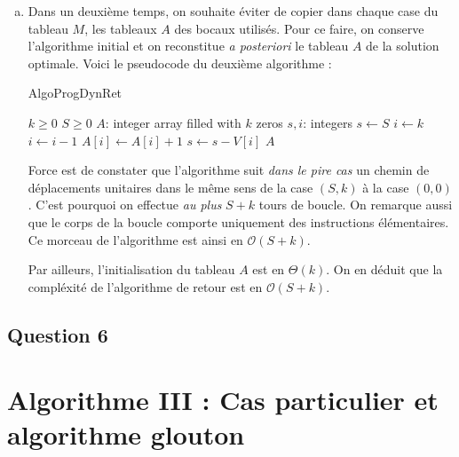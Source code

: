 \documentclass[12pt,a4paper]{article}
\newcommand{\BigO}{\mathcal{O}}
\begin{document}
\begin{enumerate}[a)]
 \item Dans un deuxi\`eme temps, on souhaite \'eviter de copier dans chaque case du tableau $M$, les tableaux $A$ des bocaux utilis\'es. Pour ce faire, on conserve l'algorithme initial et on reconstitue {\itshape a posteriori} le tableau $A$ de la solution optimale. Voici le pseudocode du deuxi\`eme algorithme :
 \begin{algorithm}
\caption{AlgoProgDynRet}
\begin{algorithmic}[1]
\Require $k \geq 0$ \AND $S \geq 0$
    \State $A$: integer array filled with $k$ zeros
    \State $s, i$: integers
    \State $s \gets S$
    \State $i \gets k$
            \State $i \gets i-1$
        \Else
            \State $A[i] \gets A[i] + 1$
            \State $s \gets s - V[i]$
        \EndIf
    \EndWhile
    \State \Return $A$
\EndFunction
\end{algorithmic}
\end{algorithm}

 
 Force est de constater que l'algorithme suit {\itshape dans le pire cas} un chemin de d\'eplacements unitaires dans le m\^eme sens de la case $(S,k)$ \`a la case $(0,0)$. C'est pourquoi on effectue {\itshape au plus} $S+k$ tours de boucle. On remarque aussi que le corps de la boucle comporte uniquement des instructions \'el\'ementaires. Ce morceau de l'algorithme est ainsi en $\BigO(S+k)$.
 
 Par ailleurs, l'initialisation du tableau $A$ est en $\Theta(k)$. On en d\'eduit que la compl\'exit\'e de l'algorithme de retour est en $\BigO(S+k)$. 
\end{enumerate}

\subsection*{Question 6}

\section{Algorithme III : Cas particulier et algorithme glouton}
\end{document}

